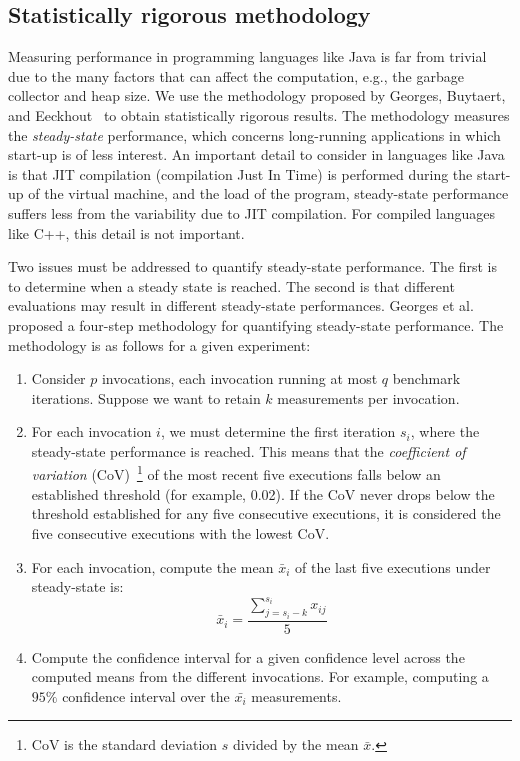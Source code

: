 \subsection{\label{subsec:stat-rigor-meth}Statistically rigorous methodology}

Measuring performance in programming languages like Java is far from trivial due to the many factors that can affect the computation, e.g., the garbage collector and heap size. We use the methodology proposed by Georges, Buytaert, and Eeckhout~\cite{DBLP_conf_oopsla_GeorgesBE07} to obtain statistically rigorous results.  The methodology measures the \textit{steady-state} performance, which concerns long-running applications in which start-up is of less interest. An important detail to consider in languages like Java is that JIT  compilation (compilation Just In Time) is performed during the start-up of the virtual machine, and the load of the program, steady-state performance suffers less from the variability due to JIT compilation. For compiled languages like C++, this detail is not important.

Two issues must be addressed to quantify steady-state performance. The first is to determine when a steady state is reached. The second is that different evaluations may result in different steady-state performances. Georges et al. proposed a four-step methodology for quantifying steady-state performance. The methodology is as follows for a given experiment:

\begin{enumerate}
    \item Consider \(p\) invocations, each invocation running at most \(q\) benchmark iterations. Suppose we want to retain \(k\) measurements per invocation.
    \item For each invocation \(i\), we must determine the first iteration \(s_i\), where the steady-state performance is reached. This means that the \textit{coefficient of variation} (CoV)~\footnote{CoV is the standard deviation \(s\) divided by the mean \(\bar{x}\).} of the most recent five {executions} falls below an established threshold (for example, 0.02). If the CoV never drops below the threshold established for any five consecutive {executions}, it is considered the five consecutive {executions} with the lowest CoV.
    \item For each invocation, compute the mean \(\bar{x}_i\) of the last five {executions} under steady-state is:
    \begin{equation*}
      \bar{x}_i = \frac{\sum^{s_i}_{j=s_i - k}x_{ij}}{5}
    \end{equation*}
    \item Compute the confidence interval for a given confidence level across the computed means from the different invocations. For example, computing a \(95\%\) confidence interval over the \(\bar{x_i}\) measurements.
\end{enumerate}

